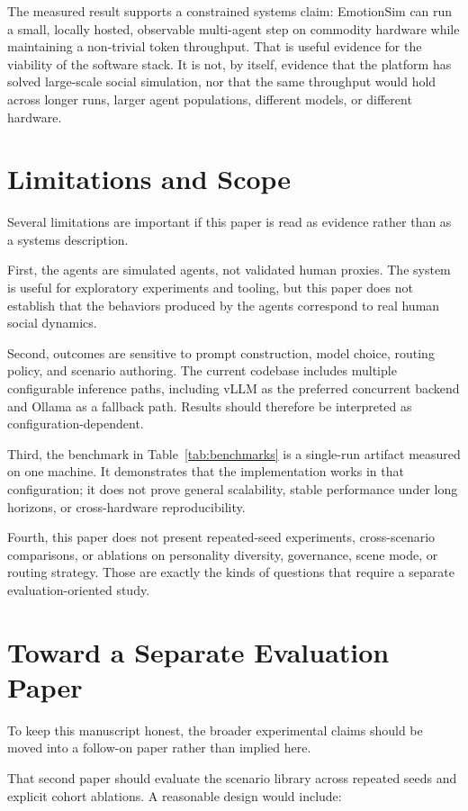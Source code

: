 \documentclass{article}
\begin{document}
The measured result supports a constrained systems claim: EmotionSim can run a small, locally hosted, observable multi-agent step on commodity hardware while maintaining a non-trivial token throughput. That is useful evidence for the viability of the software stack. It is not, by itself, evidence that the platform has solved large-scale social simulation, nor that the same throughput would hold across longer runs, larger agent populations, different models, or different hardware.

\section{Limitations and Scope}
Several limitations are important if this paper is read as evidence rather than as a systems description.

First, the agents are simulated agents, not validated human proxies. The system is useful for exploratory experiments and tooling, but this paper does not establish that the behaviors produced by the agents correspond to real human social dynamics.

Second, outcomes are sensitive to prompt construction, model choice, routing policy, and scenario authoring. The current codebase includes multiple configurable inference paths, including vLLM as the preferred concurrent backend and Ollama as a fallback path. Results should therefore be interpreted as configuration-dependent.

Third, the benchmark in Table~\ref{tab:benchmarks} is a single-run artifact measured on one machine. It demonstrates that the implementation works in that configuration; it does not prove general scalability, stable performance under long horizons, or cross-hardware reproducibility.

Fourth, this paper does not present repeated-seed experiments, cross-scenario comparisons, or ablations on personality diversity, governance, scene mode, or routing strategy. Those are exactly the kinds of questions that require a separate evaluation-oriented study.

\section{Toward a Separate Evaluation Paper}
To keep this manuscript honest, the broader experimental claims should be moved into a follow-on paper rather than implied here.

That second paper should evaluate the scenario library across repeated seeds and explicit cohort ablations. A reasonable design would include:
\end{document}
